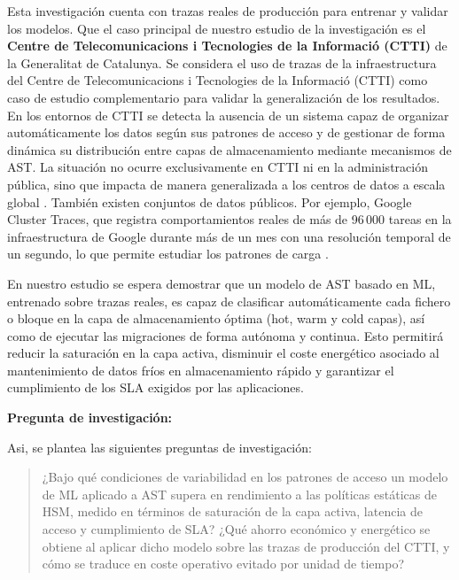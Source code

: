 Esta investigación cuenta con trazas reales de producción para entrenar y validar los modelos.
Que el caso principal de nuestro estudio de la investigación es el \textbf{Centre de Telecomunicacions i Tecnologies de la Informació (CTTI)} de la Generalitat de Catalunya.
Se considera el uso de trazas de la infraestructura del Centre de Telecomunicacions i Tecnologies de la Informació (CTTI) como caso de estudio complementario para validar la generalización de los resultados.
En los entornos de CTTI se detecta la ausencia de un sistema capaz de organizar automáticamente los datos según sus patrones de acceso y de gestionar de forma dinámica su distribución entre capas de almacenamiento mediante mecanismos de AST.
La situación no ocurre exclusivamente en CTTI ni en la administración pública, sino que impacta de manera generalizada a los centros de datos a escala global \parencite{cortez2017resource}.
También existen conjuntos de datos públicos.
Por ejemplo, Google Cluster Traces, que registra comportamientos reales de más de 96\,000 tareas en la infraestructura de Google durante más de un mes con una resolución temporal de un segundo, lo que permite estudiar los patrones de carga \parencite{reiss2012heterogeneity}.

En nuestro estudio se espera demostrar que un modelo de AST basado en ML, entrenado sobre trazas reales, es capaz de clasificar automáticamente cada fichero o bloque en la capa de almacenamiento óptima (hot, warm y cold capas),  así como de ejecutar las migraciones de forma autónoma y continua.
Esto permitirá reducir la saturación en la capa activa, disminuir el coste energético asociado al mantenimiento de datos fríos en almacenamiento rápido y garantizar el cumplimiento de los SLA exigidos por las aplicaciones.


\medskip
\noindent\textbf{Pregunta de investigación:}

Asi, se plantea las siguientes preguntas de investigación:

\begin{quote}
    ¿Bajo qué condiciones de variabilidad en los patrones de acceso un modelo de ML aplicado a AST supera en rendimiento a las políticas estáticas de HSM, medido en términos de saturación de la capa activa, latencia de acceso y cumplimiento de SLA?
    ¿Qué ahorro económico y energético se obtiene al aplicar dicho modelo sobre las trazas de producción del CTTI, y cómo se traduce en coste operativo evitado por unidad de tiempo?
\end{quote}
